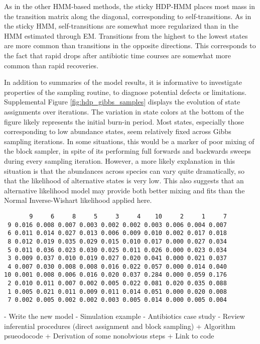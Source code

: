 \documentclass{article}
\begin{document}
As in the other HMM-based methods, the sticky HDP-HMM places most mass in the
transition matrix along the diagonal, corresponding to self-transitions. As in
the sticky HMM, self-transitions are somewhat more regularized than in the HMM
estimated through EM. Transitions from the highest to the lowest states are more
common than transitions in the opposite directions. This corresponds to the fact
that rapid drops after antibiotic time courses are somewhat more common than
rapid recoveries.

In addition to summaries of the model results, it is informative to investigate
properties of the sampling routine, to diagnose potential defects or
limitations. Supplemental Figure \ref{fig:hdp_gibbs_samples} displays the
evolution of state assignments over iterations. The variation in state colors at
the bottom of the figure likely represents the initial burn-in period. Most
states, especially those corresponding to low abundance states, seem relatively
fixed across Gibbs sampling iterations. In some situations, this would be a
marker of poor mixing of the block sampler, in spite of its performing full
forwards and backwards sweeps during every sampling iteration. However, a more
likely explanation in this situation is that the abundances across species can
vary quite dramatically, so that the likelihood of alternative states is very
low. This also suggests that an alternative likelihood model may provide both
better mixing and fits than the Normal Inverse-Wishart likelihood applied here.

\begin{verbatim}
       9     6     8     5     3     4    10     2     1     7
 9 0.016 0.008 0.007 0.003 0.002 0.002 0.003 0.006 0.004 0.007
 6 0.011 0.014 0.027 0.013 0.006 0.009 0.010 0.002 0.017 0.018
 8 0.012 0.019 0.035 0.029 0.015 0.010 0.017 0.000 0.027 0.034
 5 0.011 0.036 0.023 0.030 0.025 0.011 0.026 0.000 0.023 0.034
 3 0.009 0.037 0.010 0.019 0.027 0.020 0.041 0.000 0.021 0.037
 4 0.007 0.030 0.008 0.008 0.016 0.022 0.057 0.000 0.014 0.040
10 0.001 0.008 0.006 0.016 0.020 0.037 0.284 0.000 0.059 0.176
 2 0.010 0.011 0.007 0.002 0.005 0.022 0.081 0.020 0.035 0.088
 1 0.005 0.021 0.011 0.009 0.011 0.014 0.051 0.000 0.020 0.008
 7 0.002 0.005 0.002 0.002 0.003 0.005 0.014 0.000 0.005 0.004
\end{verbatim}

- Write the new model
- Simulation example
- Antibiotics case study
- Review inferential procedures (direct assignment and block sampling)
  + Algorithm psueodocode
  + Derivation of some nonobvious steps
  + Link to code
\end{document}
